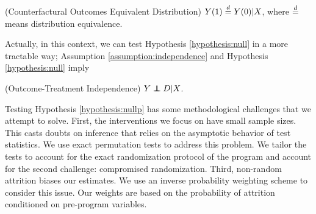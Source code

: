 \begin{hypothesis} 
\label{hypothesis:null}
(Counterfactural Outcomes Equivalent Distribution) 
$Y(1) \overset{d}{=} Y(0) | X$, where $\overset{d}{=}$ means distribution equivalence.
\end{hypothesis}

\noindent Actually, in this context, we can test Hypothesis \ref{hypothesis:null} in a more tractable way; Assumption \ref{assumption:independence}
and Hypothesis \ref{hypothesis:null} imply
\begin{hypothesis} (Outcome-Treatment Independence)\label{hypothesis:nullp}
$Y \independent D|X $.
\end{hypothesis}

\indent Testing Hypothesis \ref{hypothesis:nullp} has some methodological challenges that we attempt to solve. First, the interventions we focus on have small sample sizes. This casts doubts on inference that relies on the asymptotic behavior of test statistics. We use exact permutation tests to address this problem. We tailor the tests to account for the exact randomization protocol of the program and account for the second challenge: compromised randomization. Third, non-random attrition biases our estimates. We use an inverse probability weighting scheme to consider this issue. Our weights are based on the probability of attrition conditioned on pre-program variables.\\

